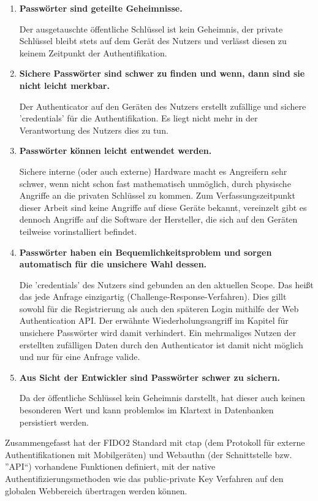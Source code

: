 \begin{enumerate} 
\item \textbf{Passwörter sind geteilte Geheimnisse.}

Der ausgetauschte öffentliche Schlüssel ist kein Geheimnis, der private Schlüssel bleibt stets auf dem Gerät des Nutzers und verlässt diesen zu keinem Zeitpunkt der Authentifikation.

\item \textbf{Sichere Passwörter sind schwer zu finden und wenn, dann sind sie nicht leicht merkbar.}

Der Authenticator auf den Geräten des Nutzers erstellt zufällige und sichere 'credentials' für die Authentifikation. Es liegt nicht mehr in der Verantwortung des Nutzers dies zu tun.

\item \textbf{Passwörter können leicht entwendet werden.}

Sichere interne (oder auch externe) Hardware macht es Angreifern sehr schwer, wenn nicht schon fast mathematisch unmöglich, durch physische Angriffe an die privaten Schlüssel zu kommen. Zum Verfassungszeitpunkt dieser Arbeit sind keine Angriffe auf diese Geräte bekannt, vereinzelt gibt es dennoch Angriffe auf die Software der Hersteller, die sich auf den Geräten teilweise vorinstalliert befindet.

\item \textbf{Passwörter haben ein Bequemlichkeitsproblem und sorgen automatisch für die unsichere Wahl dessen.}

Die 'credentials' des Nutzers sind gebunden an den aktuellen Scope. Das heißt das jede Anfrage einzigartig (Challenge-Response-Verfahren). Dies gillt sowohl für die Registrierung als auch den späteren Login mithilfe der Web Authentication API. Der erwähnte Wiederholungsangriff im Kapitel für unsichere Passwörter wird damit verhindert. Ein mehrmaliges Nutzen der erstellten zufälligen Daten durch den Authenticator ist damit nicht möglich und nur für eine Anfrage valide.

\item \textbf{Aus Sicht der Entwickler sind Passwörter schwer zu sichern.}

Da der öffentliche Schlüssel kein Geheimnis darstellt, hat dieser auch keinen besonderen Wert und kann problemlos im Klartext in Datenbanken persistiert werden.
\end{enumerate}
\newpage

Zusammengefasst hat der FIDO2 Standard mit \ac{ctap} (dem Protokoll für externe Authentifikationen mit Mobilgeräten) und Webauthn (der Schnittstelle bzw. ''API``) vorhandene Funktionen definiert, mit der native Authentifizierungsmethoden wie das public-private Key Verfahren auf den globalen Webbereich übertragen werden können.
